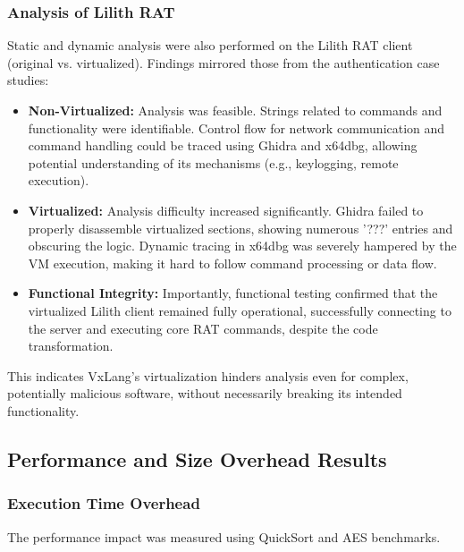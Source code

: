 \subsubsection{Analysis of Lilith RAT}
Static and dynamic analysis were also performed on the Lilith RAT client (original vs. virtualized). Findings mirrored those from the authentication case studies:
\begin{itemize}
	\item \textbf{Non-Virtualized:} Analysis was feasible. Strings related to commands and functionality were identifiable. Control flow for network communication and command handling could be traced using Ghidra and x64dbg, allowing potential understanding of its mechanisms (e.g., keylogging, remote execution).
	\item \textbf{Virtualized:} Analysis difficulty increased significantly. Ghidra failed to properly disassemble virtualized sections, showing numerous '???' entries and obscuring the logic. Dynamic tracing in x64dbg was severely hampered by the VM execution, making it hard to follow command processing or data flow.
	\item \textbf{Functional Integrity:} Importantly, functional testing confirmed that the virtualized Lilith client remained fully operational, successfully connecting to the server and executing core RAT commands, despite the code transformation.
\end{itemize}
This indicates VxLang's virtualization hinders analysis even for complex, potentially malicious software, without necessarily breaking its intended functionality.

\subsection{Performance and Size Overhead Results}

\subsubsection{Execution Time Overhead}
The performance impact was measured using QuickSort and AES benchmarks.

